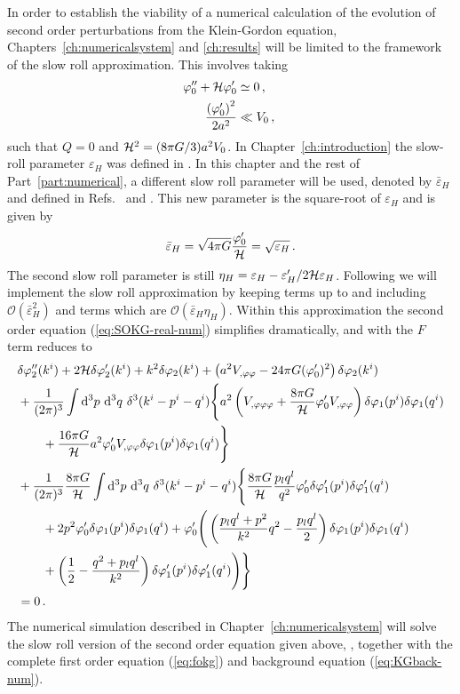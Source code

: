 In order to establish the viability of a numerical calculation of the evolution of
second order perturbations from the
Klein-Gordon equation, Chapters~\ref{ch:numericalsystem} and \ref{ch:results} will be limited to
the framework of the slow roll approximation. 
This involves taking
%
\begin{align}
 \varphi_{0}'' + \mathcal{H} \varphi_{0}' &\simeq 0\,,\quad \\
\frac{\left(\varphi_{0}'\right)^2}{2a^2} &\ll V_{0}\,,
\end{align}
%
such that $Q=0$ and $\mathcal{H}^2 = (8\pi G/3) a^2 V_{0}$. 
In Chapter~\ref{ch:introduction} the slow-roll parameter $\varepsilon_H$ was
defined in . 
In this chapter and the rest of Part~\ref{part:numerical}, a different slow 
roll parameter will be used, denoted by
$\bar{\varepsilon}_H$ and defined in Refs.~\cite{Malik:2006ir} and
\cite{Seery:2005gb}. 
This new parameter is the square-root of $\varepsilon_H$ and is given by
%
\begin{equation}
\label{eq:bareps-defn-perts}
 \bar{\varepsilon}_H = \sqrt{4\pi G} \frac{\varphi_{0}'}{\mathcal{H}} = \sqrt{\varepsilon_H}\,.
\end{equation}
%
The second slow roll parameter is still $\eta_H = \varepsilon_H -
\varepsilon_H'/2\mathcal{H} \varepsilon_H$. Following  we
will implement the slow roll approximation by keeping terms up to and including
$\mathcal{O}(\bar{\varepsilon}^2_H)$ and terms which are
$\mathcal{O}(\bar{\varepsilon}_H \eta_H)$. 
Within this approximation the second order equation (\ref{eq:SOKG-real-num})
simplifies dramatically, and with the $F$ term reduces to
%
\begin{align}
 \label{eq:KG2-fourier-sr-num}
&\dvp2''(\kvi)+2\H\dvp2'(\kvi)+k^2\dvp2(\kvi)
+\left(a^2
\Upp-{24 \pi G}(\vp_{0}')^2\right)
\dvp2(\kvi) \nonumber\\
%
&+ \frac{1}{(2\pi)^3}\int \d^3p\ \d^3q\ \delta^3(\kvi-\pvi-\qvi) \Bigg\{
a^2\left(\Uppp
+ \frac{8\pi G}{\H}\vp_{0}' \Upp\right)
 \dvp1(\pvi)\dvp1(\qvi) \nonumber \\
%
&\qquad +\frac{16\pi G}{\H}a^2
\vp_{0}'\Upp\dvp1(\pvi)\dvp1(\qvi)\Bigg\}
\nonumber \\
%
&+ \frac{1}{(2\pi)^3}\frac{8\pi G}{\H}
\int \d^3p\ \d^3q\ \delta^3(\kvi-\pvi-\qvi)  \Bigg\{
%
\frac{8\pi G}{\H}\frac{p_l q^l}{q^2}\vp_{0}'\dvp1'(\pvi)
\dvp1'(\qvi) \nonumber\\
% 
&\qquad+ 2p^2\vp_{0}' \dvp1(\pvi) \dvp1(\qvi)
%
+\vp_{0}'
\Bigg(
\left(\frac{p_lq^l+p^2}{k^2}q^2-\frac{p_lq^l}{2}\right)
\dvp1(\pvi)\dvp1(\qvi) \nonumber \\
% 
&\qquad+\left(\frac{1}{2}-\frac{q^2+p_lq^l}{k^2}\right)
\dvp1'(\pvi)\dvp1'(\qvi)\Bigg)
\Bigg\} \nonumber \\
% 
&=0 \,.
\end{align}
%
The numerical simulation described in Chapter~\ref{ch:numericalsystem} will solve the
slow roll version of the second order equation given above,
, together with the complete first
order equation (\ref{eq:fokg}) and background equation
(\ref{eq:KGback-num}). 
% 
% 
% 
% 
